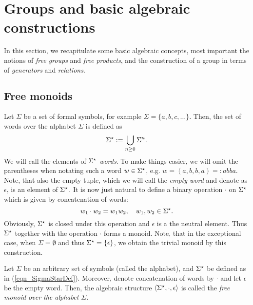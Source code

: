 \section{Groups and basic algebraic constructions}

In this section, we recapitulate some basic algebraic concepts, most important the notions of \emph{free groups} and \emph{free products}, and the construction of a group in terms of \emph{generators} and \emph{relations}. 

\subsection{Free monoids}
Let $\Sigma$ be a set of formal symbols, for example $\Sigma = \{a, b, c, \dots\}$. Then, the set of words over the alphabet $\Sigma$ is defined as
\begin{equation}
\label{eqn_SigmaStarDef}
{\Sigma}^{\star} := \bigcup_{n\ge0} \Sigma^n.
\end{equation}
We will call the elements of ${\Sigma}^{\star}$ \emph{words}. To make things easier, we will omit the parentheses when notating such a word $w \in {\Sigma}^{\star}$, e.g. $w = (a,b,b,a) =: abba$. Note, that also the empty tuple, which we will call the \emph{empty word} and denote as $\epsilon$, is an element of ${\Sigma}^{\star}$. It is now just natural to define a binary operation $\cdot$ on ${\Sigma}^{\star}$ which is given by concatenation of words:
\begin{equation*}
w_1 \cdot w_2 = w_1 w_2, \quad w_1, w_2 \in {\Sigma}^{\star}.
\end{equation*}
Obviously, ${\Sigma}^{\star}$ is closed under this operation and $\epsilon$ is a the neutral element. Thus ${\Sigma}^{\star}$ together with the operation $\cdot$ forms a monoid. Note, that in the exceptional case, when $\Sigma = \emptyset$ and thus ${\Sigma}^{\star} = \{\epsilon\}$, we obtain the trivial monoid by this construction. 

\begin{definition}
\label{dfn_FreeMonoid}
Let $\Sigma$ be an arbitrary set of symbols (called the alphabet), and ${\Sigma}^{\star}$ be defined as in (\ref{eqn_SigmaStarDef}). Moreover, denote concatenation of words by $\cdot$ and let $\epsilon$ be the empty word. Then, the algebraic structure $\langle {\Sigma}^{\star}, \cdot, \epsilon \rangle$ is called the \emph{free monoid over the alphabet $\Sigma$}.
\end{definition} 

